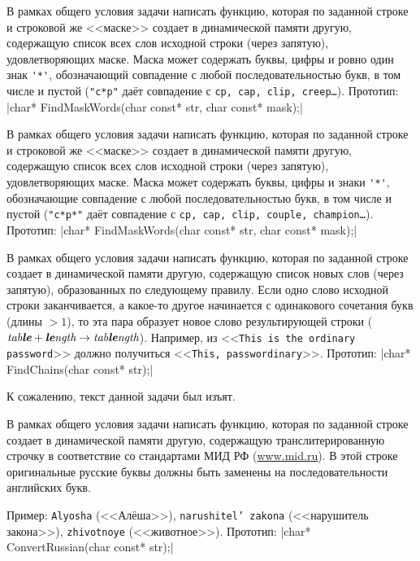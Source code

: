 \begin{zztask}
В рамках общего условия задачи написать функцию, которая по заданной строке
и строковой же <<маске>> создает в динамической памяти другую, содержащую список
всех слов исходной строки (через запятую), удовлетворяющих маске. Маска может
содержать буквы, цифры и ровно один знак \verb|'*'|, обозначающий совпадение с любой
последовательностью букв, в том числе и пустой (\verb|"c*p"| даёт совпадение с
\texttt{cp, cap, clip, creep\dots}).
%
Прототип: |char* FindMaskWords(char const* str, char const* mask);|
\end{zztask}

\begin{zztask}
В рамках общего условия задачи написать функцию, которая по заданной строке
и строковой же <<маске>> создает в динамической памяти другую, содержащую список
всех слов исходной строки (через запятую), удовлетворяющих маске. Маска может
содержать буквы, цифры и знаки \verb|'*'|, обозначающие совпадение с любой
последовательностью букв, в том числе и пустой (\verb|"c*p*"| даёт совпадение с
\texttt{cp, cap, clip, couple, champion\dots}).
%
Прототип: |char* FindMaskWords(char const* str, char const* mask);|
\end{zztask}

\begin{zztask}
В рамках общего условия задачи написать функцию, которая по заданной строке
создает в динамической памяти другую, содержащую список новых слов (через
запятую), образованных по следующему правилу. Если одно слово исходной строки
заканчивается, а какое-то другое начинается с одинакового сочетания букв
(длины $> 1$), то эта пара образует новое слово результирующей строки
($\textit{tab\textbf{le}} + \textit{\textbf{le}ngth} \rightarrow \textit{tab\textbf{le}ngth}$).
Например, из
<<\texttt{This is the ordinary password}>>
должно получиться
<<\texttt{This, passwordinary}>>.
%
Прототип: |char* FindChains(char const* str);|
\end{zztask}

\begin{zztask}[Удалена]
К сожалению, текст данной задачи был изъят.
\end{zztask}

\begin{zztask}
В рамках общего условия задачи написать функцию, которая по заданной строке
создает в динамической памяти другую, содержащую транслитерированную
строчку в соответствие со стандартами МИД РФ (\url{www.mid.ru}).
В этой строке оригинальные русские буквы должны быть заменены на
последовательности английских букв.

Пример:
\texttt{Alyosha} (<<Алёша>>), \texttt{narushitel{'} zakona}
(<<нарушитель закона>>), \texttt{zhivotnoye} (<<животное>>).
%
Прототип: |char* ConvertRussian(char const* str);|
\end{zztask}

